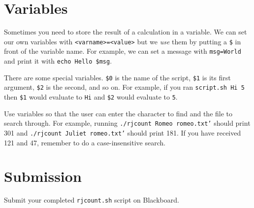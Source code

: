\documentclass[12pt]{article}
\newcommand{\code}[1]{\texttt{#1}}
\newcommand{\filename}{\code{rjcount.sh}\xspace}
\begin{document}
\section*{Variables}

Sometimes you need to store the result of a calculation in a variable.
We can set our own variables with \code{<varname>=<value>} but we \emph{use} them by putting a \code{\$} in front of the variable name.
For example, we can set a message with \code{msg=World} and print it with \code{echo Hello \$msg}.

There are some special variables.
\code{\$0} is the name of the script, \code{\$1} is its first argument, \code{\$2} is the second, and so on.
For example, if you ran \code{script.sh Hi 5} then \code{\$1} would evaluate to \code{Hi} and \code{\$2} would evaluate to \code{5}.

Use variables so that the user can enter the character to find and the file to search through.
For example, running \code{./rjcount Romeo romeo.txt'} should print 301 and \code{./rjcount Juliet romeo.txt'} should print 181.
If you have received 121 and 47, remember to do a case-insensitive search.

\section*{Submission}

Submit your completed \filename script on Blackboard.
\end{document}

